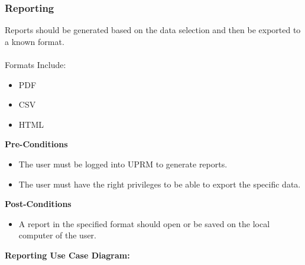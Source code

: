 \subsubsection{Reporting}
Reports should be generated based on the data selection and then be exported to a known format.\\ \\
Formats Include:
\begin{itemize}
	\item PDF
	\item CSV
	\item HTML\\
\end{itemize}
\textbf{Pre-Conditions}
\begin{itemize}
	\item The user must be logged into UPRM to generate reports.
	\item The user must have the right privileges to be able to export the specific data.\\
\end{itemize}
\textbf{Post-Conditions}
\begin{itemize}
	\item A report in the specified format should open or be saved on the local computer of the user.\\
\end{itemize}
\textbf{Reporting Use Case Diagram:}\\
\centerline{}